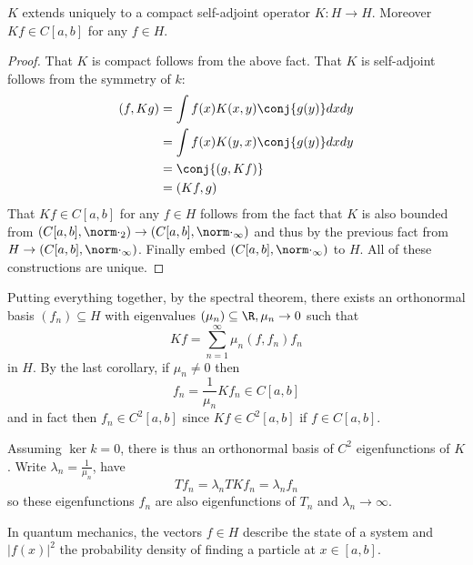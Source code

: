 \documentclass[a4paper]{article}
\begin{document}
\begin{corollary}
  \(K\) extends uniquely to a compact self-adjoint operator \(K: H \to H\). Moreover \(Kf \in C[a, b]\) for any \(f \in H\).
\end{corollary}


\begin{proof}
  That \(K\) is compact follows from the above fact. That \(K\) is self-adjoint follows from the symmetry of \(k\):
  \begin{align*}
    (f, Kg)
    &= \int f(x) K(x, y) \conj{g(y)} dxdy \\
    &= \int f(x) K(y, x) \conj{g(y)} dxdy \\
    &= \conj{(g, Kf)} \\
    &= (Kf, g)
  \end{align*}
  That \(Kf \in C[a, b]\) for any \(f \in H\) follows from the fact that \(K\) is also bounded from \((C[a, b], \norm \cdot_2) \to (C[a, b], \norm \cdot_\infty)\) and thus by the previous fact from \(H \to (C[a, b], \norm \cdot_\infty)\). Finally embed \((C[a, b], \norm \cdot_\infty)\) to \(H\). All of these constructions are unique.
\end{proof}

Putting everything together, by the spectral theorem, there exists an orthonormal basis \((f_n) \subseteq H\) with eigenvalues \((\mu_n) \subseteq \R, \mu_n \to 0\) such that
\[
  Kf = \sum_{n = 1}^\infty \mu_n(f, f_n) f_n
\]
in \(H\). By the last corollary, if \(\mu_n \neq 0\) then
\[
  f_n = \frac{1}{\mu_n} Kf_n \in C[a, b]
\]
and in fact then \(f_n \in C^2[a, b]\) since \(Kf \in C^2[a, b]\) if \(f \in C[a, b]\).

Assuming \(\ker k = 0\), there is thus an orthonormal basis of \(C^2\) eigenfunctions of \(K\). Write \(\lambda_n = \frac{1}{\mu_n}\), have
\[
  Tf_n = \lambda_n TKf_n = \lambda_nf_n
\]
so these eigenfunctions \(f_n\) are also eigenfunctions of \(T_n\) and \(\lambda_n \to \infty\).


In quantum mechanics, the vectors \(f \in H\) describe the state of a system and \(|f(x)|^2\) the probability density of finding a particle at \(x \in [a, b]\).
\end{document}
